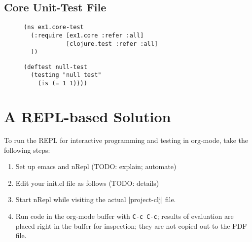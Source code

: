 \documentclass[11pt]{article}
\begin{document}
\subsection{Core Unit-Test File}
\label{sec-2-1}

\begin{figure}[H]
\label{main-test-namespace}
\begin{verbatim}
(ns ex1.core-test
  (:require [ex1.core :refer :all]
            [clojure.test :refer :all]
  ))
\end{verbatim}
\end{figure}

\begin{figure}[H]
\label{test-functions}
\begin{verbatim}
(deftest null-test
  (testing "null test"
    (is (= 1 1))))
\end{verbatim}
\end{figure}
\section{A REPL-based Solution}
\label{sec-3}
\label{sec:emacs-repl}
To run the REPL for interactive programming and testing in org-mode,
take the following steps:
\begin{enumerate}
\item Set up emacs and nRepl (TODO: explain; automate)
\item Edit your init.el file as follows (TODO: details)
\item Start nRepl while visiting the actual |project-clj| file.
\item Run code in the org-mode buffer with \verb|C-c C-c|; results of
evaluation are placed right in the buffer for inspection; they are
not copied out to the PDF file.
\end{enumerate}
\end{document}
